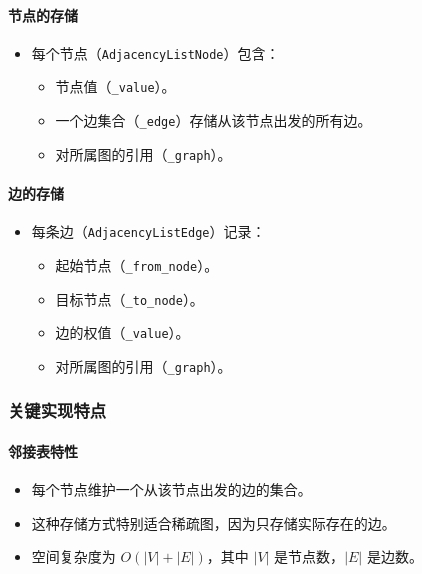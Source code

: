 \documentclass[10pt]{article}
\begin{document}
    \paragraph{节点的存储}
    \begin{itemize}[label=\textbullet]
        \item 每个节点（\texttt{AdjacencyListNode}）包含：
        \begin{itemize}[label=\textbullet]
            \item 节点值（\texttt{\_value}）。
            \item 一个边集合（\texttt{\_edge}）存储从该节点出发的所有边。
            \item 对所属图的引用（\texttt{\_graph}）。
        \end{itemize}
    \end{itemize}

    \paragraph{边的存储}
    \begin{itemize}[label=\textbullet]
        \item 每条边（\texttt{AdjacencyListEdge}）记录：
        \begin{itemize}[label=\textbullet]
            \item 起始节点（\texttt{\_from\_node}）。
            \item 目标节点（\texttt{\_to\_node}）。
            \item 边的权值（\texttt{\_value}）。
            \item 对所属图的引用（\texttt{\_graph}）。
        \end{itemize}
    \end{itemize}

    \subsubsection{关键实现特点}

    \paragraph{邻接表特性}
    \begin{itemize}[label=\textbullet]
        \item 每个节点维护一个从该节点出发的边的集合。
        \item 这种存储方式特别适合稀疏图，因为只存储实际存在的边。
        \item 空间复杂度为 $O(|V| + |E|)$，其中 $|V|$ 是节点数，$|E|$ 是边数。
    \end{itemize}
\end{document}
